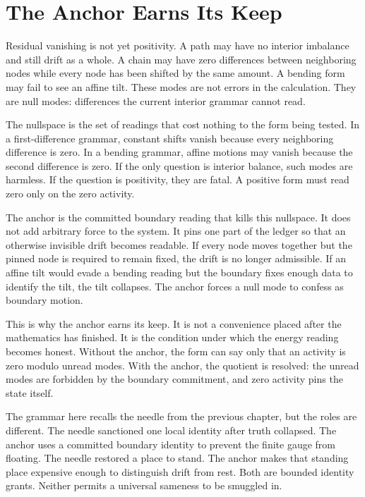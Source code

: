 \section{The Anchor Earns Its Keep}

Residual vanishing is not yet positivity. A path may have no interior
imbalance and still drift as a whole. A chain may have zero differences
between neighboring nodes while every node has been shifted by the same
amount. A bending form may fail to see an affine tilt. These modes are not
errors in the calculation. They are null modes: differences the current
interior grammar cannot read.

The nullspace is the set of readings that cost nothing to the form being
tested. In a first-difference grammar, constant shifts vanish because every
neighboring difference is zero. In a bending grammar, affine motions may
vanish because the second difference is zero. If the only question is
interior balance, such modes are harmless. If the question is positivity,
they are fatal. A positive form must read zero only on the zero activity.

The anchor is the committed boundary reading that kills this nullspace. It
does not add arbitrary force to the system. It pins one part of the ledger
so that an otherwise invisible drift becomes readable. If every node moves
together but the pinned node is required to remain fixed, the drift is no
longer admissible. If an affine tilt would evade a bending reading but the
boundary fixes enough data to identify the tilt, the tilt collapses. The
anchor forces a null mode to confess as boundary motion.

This is why the anchor earns its keep. It is not a convenience placed after
the mathematics has finished. It is the condition under which the energy
reading becomes honest. Without the anchor, the form can say only that an
activity is zero modulo unread modes. With the anchor, the quotient is
resolved: the unread modes are forbidden by the boundary commitment, and
zero activity pins the state itself.

The grammar here recalls the needle from the previous chapter, but the
roles are different. The needle sanctioned one local identity after truth
collapsed. The anchor uses a committed boundary identity to prevent the
finite gauge from floating. The needle restored a place to stand. The
anchor makes that standing place expensive enough to distinguish drift from
rest. Both are bounded identity grants. Neither permits a universal sameness
to be smuggled in.

